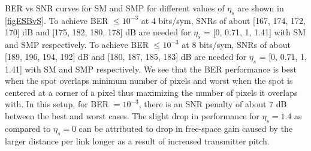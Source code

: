BER vs SNR curves for SM and SMP for different values of $\eta_{s}$ are shown in \figurename{ \ref{figESBvS}}. To achieve BER $\leq 10^{-3}$ at 4 bits/sym, SNRs of about [167, 174, 172, 170] dB and [175, 182, 180, 178] dB are needed for $\eta_{s}$ = [0, 0.71, 1, 1.41] with SM and SMP respectively. To achieve BER $\leq 10^{-3}$ at 8 bits/sym, SNRs of about [189, 196, 194, 192] dB and [180, 187, 185, 183] dB are needed for $\eta_{s}$ = [0, 0.71, 1, 1.41] with SM and SMP respectively. We see that the BER performance is best when the spot overlaps minimum number of pixels and worst when the spot is centered at a corner of a pixel thus maximizing the number of pixels it overlaps with. In this setup, for BER $=10^{-3}$, there is an SNR penalty of about 7 dB between the best and worst cases. The slight drop in performance for $\eta_{s}=1.4$ as compared to $\eta_{s}=0$ can be attributed to drop in free-space gain caused by the larger distance per link longer as a result of increased transmitter pitch.

